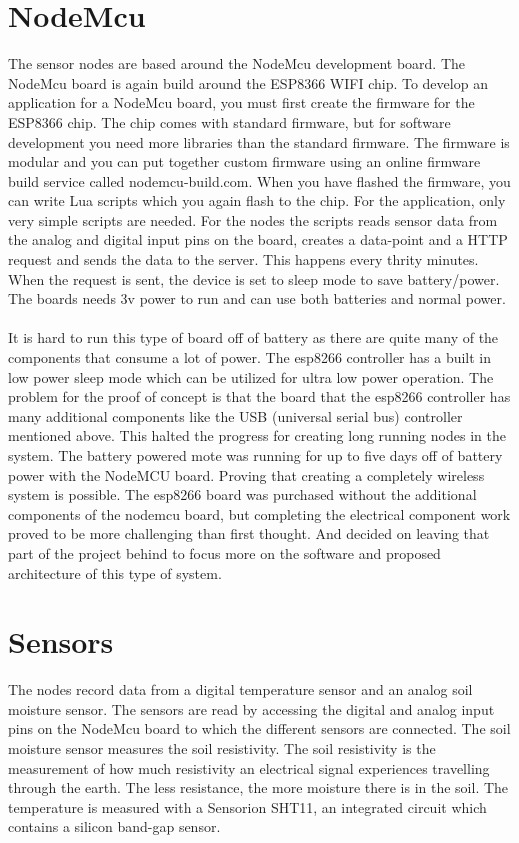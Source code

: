 \documentclass[]{uiophd}
\begin{document}
\section{NodeMcu}
The sensor nodes are based around the NodeMcu development board. The NodeMcu board is again build around the ESP8366 WIFI chip. To develop an application for a NodeMcu board, you must first create the firmware for the ESP8366 chip. The chip comes with standard firmware, but for software development you need more libraries than the standard firmware. The firmware is modular and you can put together custom firmware using an online firmware build service called nodemcu-build.com. When you have flashed the firmware, you can write Lua scripts which you again flash to the chip. For the application, only very simple scripts are needed. For the nodes the scripts reads sensor data from the analog and digital input pins on the board, creates a data-point and a HTTP request and sends the data to the server. This happens every thrity minutes.  When the request is sent, the device is set to sleep mode to save battery/power. The boards needs 3v power to run and can use both batteries and normal power.
\\\\
It is hard to run this type of board off of battery as there are quite many of the components that consume a lot of power. The esp8266 controller has a built in low power sleep mode which can be utilized for ultra low power operation. The problem for the proof of concept is that the board that the esp8266 controller has many additional components like the USB (universal serial bus) controller mentioned above. This halted the progress for creating long running nodes in the system. The battery powered mote was running for up to five days off of battery power with the NodeMCU board. Proving that creating a completely wireless system is possible. The esp8266 board was purchased without the additional components of the nodemcu board, but completing the electrical component work proved to be more challenging than first thought. And decided on leaving that part of the project behind to focus more on the software and proposed architecture of this type of system.

\section{Sensors}
The nodes record data from a digital temperature sensor and an analog soil moisture sensor. The sensors are read by accessing the digital and analog input pins on the NodeMcu board to which the different sensors are connected. The soil moisture sensor measures the soil resistivity. The soil resistivity is the measurement of how much resistivity an electrical signal experiences travelling through the earth. The less resistance, the more moisture there is in the soil. The temperature is measured with a Sensorion SHT11, an integrated circuit which contains a silicon band-gap sensor. \cite{sensorion}
\end{document}
